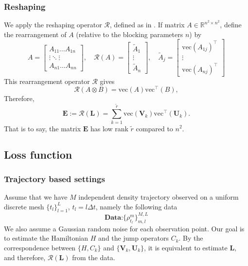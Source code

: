 \documentclass[10pt]{article}  %
\theoremstyle{plain}
\numberwithin{equation}{section}
\def\mR{\mathcal{R}}
\def\R{\mathbb{R}}
\newcommand{\bL}{\mathbf{L}}
\newcommand{\bV}{\mathbf{V}}
\newcommand{\bU}{\mathbf{U}}
\newcommand{\bE}{\mathbf{E}}
\renewcommand{\vec}{\text{vec}}
\renewcommand{\R}{\mathbb{R}}
\begin{document}
\subsubsection{Reshaping}
We apply the reshaping operator $\mR$, defined as in \cite{vanloanApproximationKroneckerProducts1993}. If matrix $A \in \R^{n^2\times n^2}$, define the rearrangement of $A$ (relative to the blocking parameters $n$) by
\begin{equation}
	A = 
	\begin{bmatrix}
 	A_{11} \dots A_{1n}\\
 	\vdots \ddots \vdots\\
 	A_{n1} \dots A_{nn} 
 	\end{bmatrix}, 
 	\quad
	\mR(A) = 
	\begin{bmatrix}
		\widetilde A_1\\ \vdots \\ \widetilde A_{n}	
	\end{bmatrix}
	,\quad 
	\widetilde A_j = 
	\begin{bmatrix}
		\vec(A_{1j})^\top \\ 
		\vdots \\
		\vec(A_{nj})^\top	
	\end{bmatrix}
\end{equation}
This rearrangement operator $\mR$ gives 
\begin{equation}
	\mR(A\otimes B) = \vec(A) \vec^\top(B),
\end{equation}
Therefore, 
\begin{equation}
	\bE := \mR(\bL) = \sum_{k = 1}^{\widetilde{r}} \vec(\bV_k) \vec^\top(\bU_k).
\end{equation}
That is to say, the matrix $\bE$ has low rank $\widetilde{r}$ compared to $n^2$. 

\subsection{Loss function}
\subsubsection{Trajectory based settings}
Assume that we have $M$ independent density trajectory observed on a uniform discrete mesh $\{t_l\}_{l = 1}^L$, $t_l = l \Delta t$, namely the following data
\begin{equation}
	\textbf{Data:} \{\rho^m_{t_l}\}_{m, l}^{M, L}
\end{equation}
We also assume a Gaussian random noise for each observation point. Our goal is to estimate the Hamiltonian $H$ and the jump operators $C_k$. By the correspondence between $\{H, C_k\}$ and $\{\bV_k, \bU_k\}$, it is equivalent to estimate $\bL$, and therefore, $\mR(\bL)$ from the data. 
\end{document}
